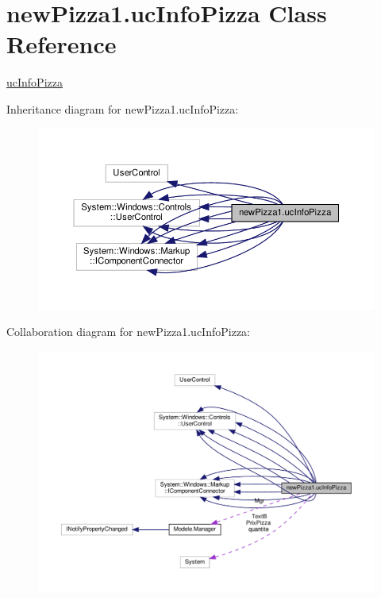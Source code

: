 \hypertarget{classnewPizza1_1_1ucInfoPizza}{}\section{new\+Pizza1.\+uc\+Info\+Pizza Class Reference}
\label{classnewPizza1_1_1ucInfoPizza}


\hyperlink{classnewPizza1_1_1ucInfoPizza}{uc\+Info\+Pizza}  




Inheritance diagram for new\+Pizza1.\+uc\+Info\+Pizza\+:
\nopagebreak
\begin{figure}[H]
\begin{center}
\leavevmode
\includegraphics[width=350pt]{classnewPizza1_1_1ucInfoPizza__inherit__graph}
\end{center}
\end{figure}


Collaboration diagram for new\+Pizza1.\+uc\+Info\+Pizza\+:
\nopagebreak
\begin{figure}[H]
\begin{center}
\leavevmode
\includegraphics[width=350pt]{classnewPizza1_1_1ucInfoPizza__coll__graph}
\end{center}
\end{figure}
